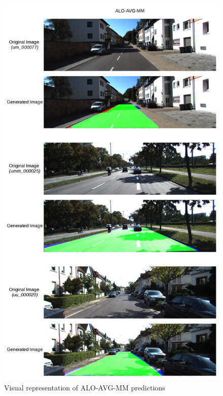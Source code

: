 \begin{figure}
  \centering
  \includegraphics[width=0.9\columnwidth]{../imagens/ilustracoes/cap6_kitti_visual_representation.png}
  \caption{Visual representation of ALO-AVG-MM predictions}
  \label{fig:kitti_representacao_visual}
\end{figure}
